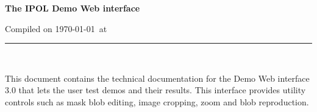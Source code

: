 \documentclass[a4paper,12pt]{article}
\begin{document}
\begin{titlepage}

\begin{center}
\vspace*{-1in}

\vspace*{0.6in}
\begin{Large}
\textbf{The IPOL Demo Web interface} \\
\end{Large}

\vspace*{0.6in}

\small{Compiled on \today\ at \currenttime}

\vspace*{0.6in}
\rule{80mm}{0.1mm}\\
\vspace*{0.1in}
\end{center}

\end{titlepage}

This document contains the technical documentation for the Demo Web interface 3.0 that lets the user test demos and their results. This interface provides utility controls such as mask blob editing, image cropping, zoom and blob reproduction.

\vspace*{0.6in}

\newpage

{
\hypersetup{linkbordercolor=white}
\tableofcontents
}
\newpage

{
\hypersetup{linkbordercolor=white}
\listoffigures
}
\newpage



%
%
\end{document}
